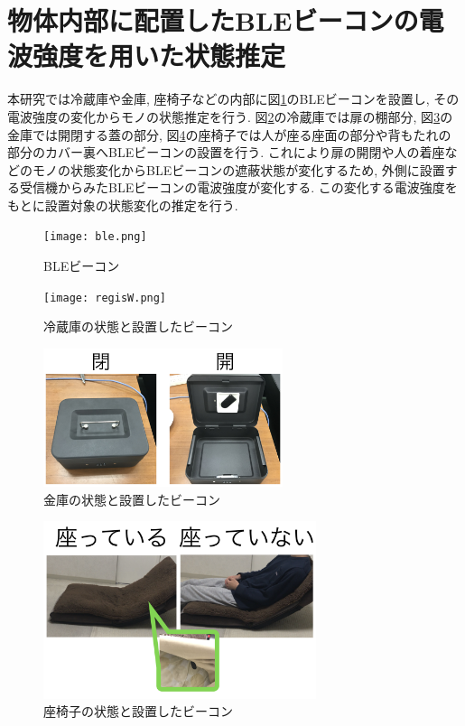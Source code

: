 \documentclass[Japanese]{dicomopapers}
\begin{document}





\section{物体内部に配置したBLEビーコンの電波強度を用いた状態推定}
本研究では冷蔵庫や金庫, 座椅子などの内部に図\ref{beacon}のBLEビーコンを設置し, その電波強度の変化からモノの状態推定を行う.
図\ref{freezer}の冷蔵庫では扉の棚部分, 図\ref{safe}の金庫では開閉する蓋の部分, 図\ref{chair}の座椅子では人が座る座面の部分や背もたれの部分のカバー裏へBLEビーコンの設置を行う.
これにより扉の開閉や人の着座などのモノの状態変化からBLEビーコンの遮蔽状態が変化するため, 外側に設置する受信機からみたBLEビーコンの電波強度が変化する.
この変化する電波強度をもとに設置対象の状態変化の推定を行う.
\begin{figure}[ht]
    \centering
    \texttt{[image: ble.png]}
    \caption{BLEビーコン}
    \label{beacon}
   \end{figure}
\begin{figure}[ht]
    \centering
    \texttt{[image: regisW.png]}
    \caption{冷蔵庫の状態と設置したビーコン}
    \label{freezer}
\end{figure}
\begin{figure}[ht]
    \centering
    \includegraphics[width=7cm]{kinkoW.png}
    \caption{金庫の状態と設置したビーコン}
    \label{safe}
\end{figure}
\begin{figure}[ht]
    \centering
    \includegraphics[width=8cm]{zaisuW.png}
    \caption{座椅子の状態と設置したビーコン}
    \label{chair}
\end{figure}
\end{document}
